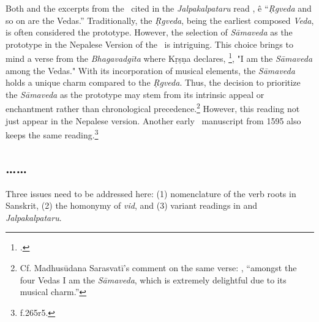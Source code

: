 Both \SuComma{}{} and the excerpts from the \SS\ cited in the 
\emph{Jalpakalpataru} read , ê
“\emph{Ṛgveda} and so on are the Vedas.” 
 Traditionally, the \emph{Ṛgveda}, being the earliest composed \emph{Veda}, 
is often considered the prototype. 
However, the selection of \emph{Sāmaveda} as the prototype in the Nepalese 
Version of the \SS\ is intriguing. 
This choice brings to mind a verse from the \emph{Bhagavadgīta} where Kṛṣṇa 
declares, 
\footcite[10.22][456]{pans-1936}, 
"I am the \emph{Sāmaveda} among the Vedas." 
With its incorporation of musical elements, 
the \emph{Sāmaveda} holds a unique charm compared to the \emph{Ṛgveda}. 
Thus, the decision to prioritize the \emph{Sāmaveda} as the prototype 
	may stem from its intrinsic appeal or enchantment rather than chronological 
precedence.\footnote{
	Cf. Madhusūdana Sarasvatī's comment on the same verse: 
	\parencite[10.22][456]{pans-1936}, 
	“amongst the four Vedas I am the \emph{Sāmaveda}, which is extremely 
delightful due to its musical charm.”}
However, this reading not just appear in the Nepalese version. 
Another early \SS\ manuscript from 1595 also keeps the same 
reading.\footnote{ f.265r5.}
	 
\subsection{\ldots{}\ldots}
	 
Three issues need to be addressed here: 
	(1) nomenclature of the verb roots in Sanskrit, 
	(2) the homonymy of \emph{vid}, and 
	(3) variant readings in \SuComma{}{} and \emph{Jalpakalpataru}. 
	 		
